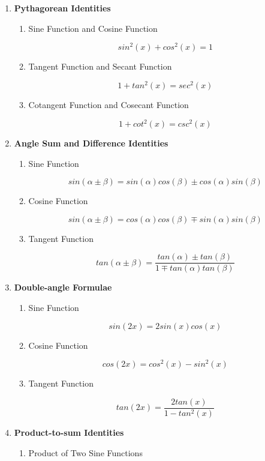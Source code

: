 \documentclass[a4paper,12pt]{article}
\newenvironment{alist}{ %
\begin{enumerate}[label=(\alph*)]
}{
\end{enumerate}
}
\newenvironment{rlist}{ %
\begin{enumerate}[label=(\roman*)]
}{
\end{enumerate}
}
\begin{document}
\begin{alist}
  \item \textbf{Pythagorean Identities}
  \begin{rlist}
    \item Sine Function and Cosine Function

    $$sin^{2}(x)+cos^{2}(x)=1$$

    \item Tangent Function and Secant Function

    $$1+tan^{2}(x)=sec^{2}(x)$$

    \item Cotangent Function and Cosecant Function

    $$1+cot^{2}(x)=csc^{2}(x)$$

  \end{rlist}
  \item \textbf{Angle Sum and Difference Identities}
  \begin{rlist}
    \item Sine Function

    $$sin(\alpha\pm \beta)=sin(\alpha)cos(\beta)\pm cos(\alpha)sin(\beta)$$

    \item Cosine Function

    $$sin(\alpha\pm \beta)=cos(\alpha)cos(\beta)\mp sin(\alpha)sin(\beta)$$

    \item Tangent Function

    $$tan(\alpha\pm \beta)=\frac{tan(\alpha)\pm tan(\beta)}{1\mp tan(\alpha)tan(\beta)}$$

  \end{rlist}
  \item \textbf{Double-angle Formulae}
  \begin{rlist}
    \item Sine Function

    $$sin(2x)=2sin(x)cos(x)$$

    \item Cosine Function

    $$cos(2x)=cos^{2}(x)-sin^{2}(x)$$

    \item Tangent Function

    $$tan(2x)=\frac{2tan(x)}{1-tan^{2}(x)}$$

  \end{rlist}
  \item \textbf{Product-to-sum Identities}
  \begin{rlist}
    \item Product of Two Sine Functions


\end{rlist}
\end{alist}
\end{document}
